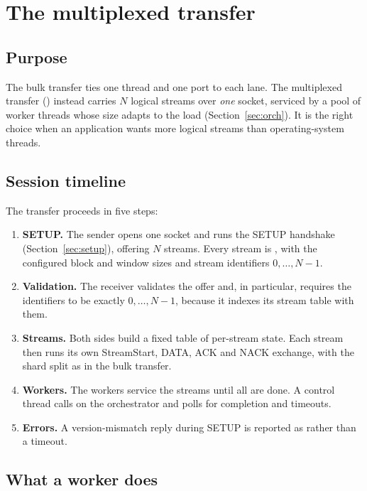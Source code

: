 \section{The multiplexed transfer}

\subsection{Purpose}

The bulk transfer ties one thread and one port to each lane. The multiplexed transfer
() instead carries $N$ logical streams over \emph{one} socket, serviced by a pool of
worker threads whose size adapts to the load (Section~\ref{sec:orch}). It is the right choice when an
application wants more logical streams than operating-system threads.

\subsection{Session timeline}

The transfer proceeds in five steps:
\begin{enumerate}
  \item \textbf{SETUP.} The sender opens one socket and runs the SETUP handshake (Section~\ref{sec:setup}),
    offering $N$ streams. Every stream is , with the configured block and window sizes and stream
    identifiers $0,\ldots,N-1$.
  \item \textbf{Validation.} The receiver validates the offer and, in particular, requires the identifiers to be
    exactly $0,\ldots,N-1$\vviii, because it indexes its stream table with them.
  \item \textbf{Streams.} Both sides build a fixed table of per-stream state. Each stream then runs its own
    StreamStart, DATA, ACK and NACK exchange, with the shard split as in the bulk transfer.
  \item \textbf{Workers.} The workers service the streams until all are done. A control thread calls
     on the orchestrator and polls for completion and timeouts.
  \item \textbf{Errors.} A version-mismatch reply during SETUP is reported as \vviii{}
    rather than a timeout.
\end{enumerate}

\subsection{What a worker does}

